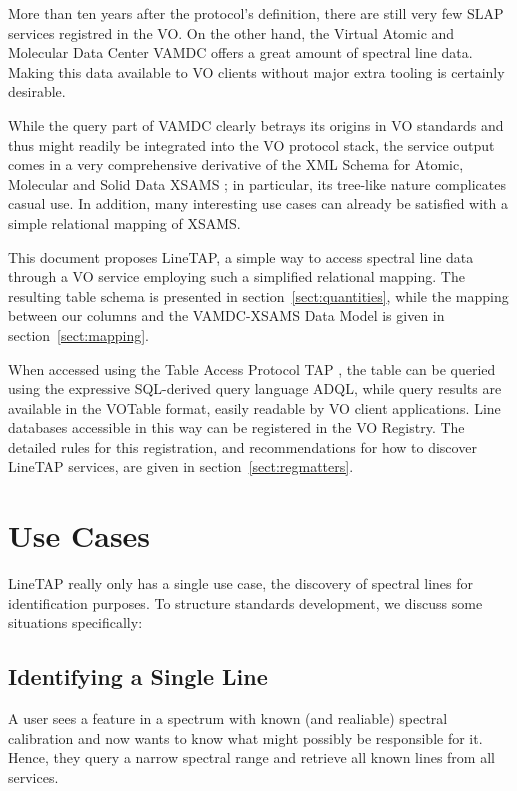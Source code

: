\documentclass[11pt,a4paper]{ivoa}
\begin{document}
More than ten years after the protocol's definition, there are still
very few SLAP services registred in the VO.
On the other hand, the Virtual Atomic and Molecular Data Center
VAMDC offers a great amount of spectral line
data.  Making this data available to VO clients without major extra
tooling is certainly desirable.

While the query part of VAMDC clearly betrays its origins in VO
standards and thus might readily be integrated into the VO protocol
stack, the service output comes in a very comprehensive derivative of
the XML Schema for Atomic, Molecular and Solid Data XSAMS
\citep{XSAMS:Docs}; in particular, its tree-like nature complicates
casual use.  In addition, many interesting use cases can already be
satisfied with a simple relational mapping of XSAMS. 

This document proposes LineTAP, a simple way to access spectral line
data through a VO service employing such a simplified relational
mapping.  The resulting table schema is presented in
section~\ref{sect:quantities}, while the mapping between our columns and the
VAMDC-XSAMS Data Model is given in section~\ref{sect:mapping}.

When accessed using the Table Access Protocol TAP
\citep{2019ivoa.spec.0927D}, the table can be queried using the
expressive SQL-derived query language ADQL, while query results are
available in the VOTable format, easily readable by VO client
applications.  Line databases accessible in this way can be registered
in the VO Registry.  The detailed rules for this registration, and
recommendations for how to discover LineTAP services, are given in
section~\ref{sect:regmatters}.



\section{Use Cases}

LineTAP really only has a single use case, the discovery of spectral
lines for identification purposes.  To structure standards development,
we discuss some situations specifically:

\subsection{Identifying a Single Line}

A user sees a feature in a spectrum with known (and realiable) spectral
calibration and now wants to know what might possibly be responsible for
it.  Hence, they query a narrow spectral range and retrieve all known
lines from all services.
\end{document}
